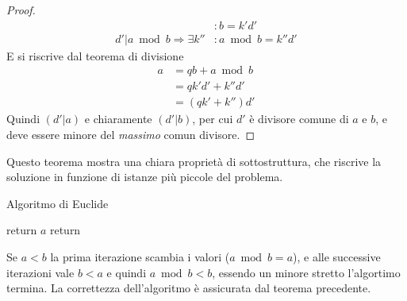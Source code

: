 \begin{theorem} [Euclide]
\begin{proof}
\begin{align*}
            &
            : b = k' d'
            \\
            d' | a \bmod b
            \Rightarrow
            \exists k'' 
            &
            : a \bmod b = k'' d'
        \end{align*}
        E si riscrive dal teorema di divisione
        \begin{align*}
            a
            &= 
            qb + a \bmod b
            \\
            &= 
            q k' d' 
            +
            k'' d'
            \\
            &= 
            \left( 
                q k' + k''
            \right) d'
        \end{align*}
        Quindi $
        \left( d' | a \right)
        $ e chiaramente $
        \left( d' | b \right)
        $, per cui $d'$ è divisore comune di $a$ e $b$, e deve essere minore del \emph{massimo} comun divisore.
    \end{proof}
\end{theorem}
Questo teorema mostra una chiara proprietà di sottostruttura, che riscrive la soluzione in funzione di istanze più piccole del problema.
\begin{algorithm}[H]
\caption{Algoritmo di Euclide}\label{alg:euclide}
\begin{algorithmic}[1]
            \State return $a$
        \EndIf
        \State return 
    \EndProcedure
\end{algorithmic}
\end{algorithm}
Se $a < b$ la prima iterazione scambia i valori ($
    a \bmod b = a
$), e alle successive iterazioni vale $b < a$ e quindi $a \bmod b < b$, essendo un minore stretto l'algortimo termina.
La correttezza dell'algoritmo è assicurata dal teorema precedente.

